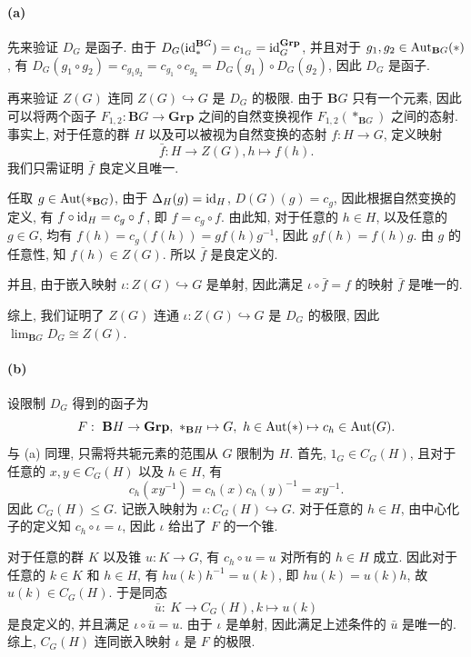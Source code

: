 \documentclass{article}
\begin{document}
\begin{solution}
	\paragraph{(a)} 先来验证 $D_G$ 是函子. 由于 $D_G(\operatorname{id}_{*}^{\mathbf{B}G}) = c_{1_G} = \operatorname{id}_G^{\mathbf{Grp}}$, 并且对于 $g_1, g_2 \in \operatorname{Aut}_{\mathbf{B}G}(*)$, 有 $D_G(g_1 \circ g_2) = c_{g_1g_2} = c_{g_1} \circ c_{g_2} = D_G(g_1) \circ D_G(g_2)$, 因此 $D_G$ 是函子.

	再来验证 $Z(G)$ 连同 $Z(G) \hookrightarrow G$ 是 $D_G$ 的极限. 由于 $\mathbf{B}G$ 只有一个元素, 因此可以将两个函子 $F_{1,2}: \mathbf{B}G \to \mathbf{Grp}$ 之间的自然变换视作 $F_{1,2}(*_{\mathbf{B}G})$ 之间的态射. 事实上, 对于任意的群 $H$ 以及可以被视为自然变换的态射 $f: H \to G$, 定义映射 
	\[ \bar{f}: H \to Z(G), h \mapsto f(h). \]
	我们只需证明 $\bar{f}$ 良定义且唯一. 

	任取 $g \in \operatorname{Aut}(*_{\mathbf{B}G})$, 由于 $\Delta_H(g) = \operatorname{id}_H$, $D(G)(g) = c_g$, 因此根据自然变换的定义, 有 $f \circ \operatorname{id}_H = c_g \circ f$, 即 $f = c_g \circ f$. 由此知, 对于任意的 $h \in H$, 以及任意的 $g \in G$, 均有 $f(h) = c_g(f(h)) = g f(h) g^{-1}$, 因此 $g f(h) = f(h) g$. 由 $g$ 的任意性, 知 $f(h) \in Z(G)$. 所以 $\bar{f}$ 是良定义的. 

	并且, 由于嵌入映射 $\iota: Z(G) \hookrightarrow G$ 是单射, 因此满足 $\iota \circ \bar{f} = f$ 的映射 $\bar{f}$ 是唯一的. 

	综上, 我们证明了 $Z(G)$ 连通 $\iota: Z(G) \hookrightarrow G$ 是 $D_G$ 的极限, 因此 $\lim_{\mathbf{B}G}D_G \cong Z(G)$. 

	\paragraph{(b)} 设限制 $D_G$ 得到的函子为
	\[ F: \ \mathbf{B}H \to \mathbf{Grp}, \ *_{\mathbf{B}H} \mapsto G, \ h \in \operatorname{Aut}(*) \mapsto c_h \in \operatorname{Aut}(G). \]
	与 (a) 同理, 只需将共轭元素的范围从 $G$ 限制为 $H$. 首先, $1_G \in C_G(H)$, 且对于任意的 $x, y \in C_G(H)$ 以及 $h \in H$, 有
	\[ c_h(xy^{-1}) = c_h(x)c_h(y)^{-1} = xy^{-1}. \]
	因此 $C_G(H) \le G$. 记嵌入映射为 $\iota: C_G(H) \hookrightarrow G$. 对于任意的 $h \in H$, 由中心化子的定义知 $c_h \circ \iota = \iota$, 因此 $\iota$ 给出了 $F$ 的一个锥.

	对于任意的群 $K$ 以及锥 $u: K \to G$, 有 $c_h \circ u = u$ 对所有的 $h \in H$ 成立. 因此对于任意的 $k \in K$ 和 $h \in H$, 有 $hu(k)h^{-1} = u(k)$, 即 $hu(k) = u(k)h$, 故 $u(k) \in C_G(H)$. 于是同态
	\[ \bar{u}: \ K \to C_G(H), k \mapsto u(k) \]
	是良定义的, 并且满足 $\iota \circ \bar{u} = u$. 由于 $\iota$ 是单射, 因此满足上述条件的 $\bar{u}$ 是唯一的. 综上, $C_G(H)$ 连同嵌入映射 $\iota$ 是 $F$ 的极限.
\end{solution}
\end{document}
